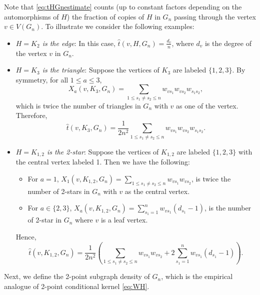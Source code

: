 \documentclass[11pt,reqno]{amsart}
\numberwithin{equation}{section}
\theoremstyle{definition}
\begin{document}
Note that \eqref{eq:tHGnestimate} counts (up to constant factors depending on the automorphisms of $H$) the fraction of copies of $H$ in $G_n$ passing through the vertex $v \in V(G_n)$. To illustrate we consider the following examples: 

\begin{itemize} 

\item {\it $H=K_2$ is the edge}: In this case, $\hat t(v, H, G_n) = \frac{d_v}{n}$, where $d_v$ is the degree of the vertex $v$ in $G_n$. 

\item {\it $H=K_3$ is the triangle}: Suppose the vertices of $K_3$ are 
labeled $\{ 1, 2, 3\}$. By symmetry, for all $1 \leq a \leq 3$, $$X_a(v, K_3, G_n) = \sum_{1 \leq s_1 \ne s_2 \leq n} w_{v s_1}  w_{v s_2}w_{s_1 s_2},$$ which is twice the number of triangles in $G_n$ with $v$ as one of the vertex. Therefore,  
$$\hat t(v, K_3, G_n)  = \frac{1}{2n^2} \sum_{1 \leq s_1 \ne s_2 \leq n} w_{v s_1}  w_{v s_2}w_{s_1 s_2}.$$

\item {\it $H=K_{1, 2}$ is the 2-star}: Suppose the vertices of $K_{1, 2}$ are labeled $\{ 1, 2, 3\}$ with the central vertex labeled 1. Then we have the following: 

\begin{itemize}

\item For $a=1$, $X_1(v, K_{1, 2}, G_n) = \sum_{1 \leq s_1 \neq s_2 \leq n} w_{v s_1}  w_{v s_2}$, is twice the number of 2-stars in $G_n$ with $v$ as the central vertex. 

\item For $a \in \{2, 3\}$, $X_a(v, K_{1, 2}, G_n) = \sum_{s_1=1}^n w_{v s_1} (d_{s_1} - 1)$,  is the number of 2-star in $G_n$ where $v$ is a leaf vertex. 

\end{itemize}
Hence, 
$$\hat t(v, K_{1, 2}, G_n)  = \frac{1}{2n^2} \left(\sum_{1 \leq s_1 \ne s_2 \leq n} w_{v s_1}  w_{v s_2} + 2\sum_{s_1=1}^n w_{v s_1} (d_{s_1} - 1) \right).$$ 

\end{itemize}

Next, we define the 2-point subgraph density of $G_n$, which is the empirical analogue of 2-point conditional kernel \eqref{eq:WH}. 
\end{document}
